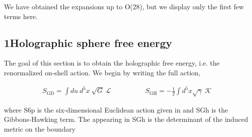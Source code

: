 \documentclass{article}
\begin{document}
We have obtained the expansions up to O(28), but we display only the first few terms here.


\subsection*{1Holographic sphere free energy}


The goal of this section is to obtain the holographic free energy, i.e. the renormalized on-shell
action. We begin by writing the full action,


\begin{equation}
\begin{array} { r } { S _ { \mathrm { G D } } = \int d u ~ d ^ { 5 } x ~ \sqrt { G } ~ \mathcal { L } \qquad \qquad \quad S _ { \mathrm { G H } } = - \frac { 1 } { 2 } \int d ^ { 5 } x \sqrt { \gamma } ~ \mathcal { K } ~ }\end{array}
\end{equation}


where S6p is the six-dimensional Euclidean action given in and SGh is the Gibbons-Hawking
term. The  appearing in SGh is the determinant of the induced metric on the boundary
\end{document}
